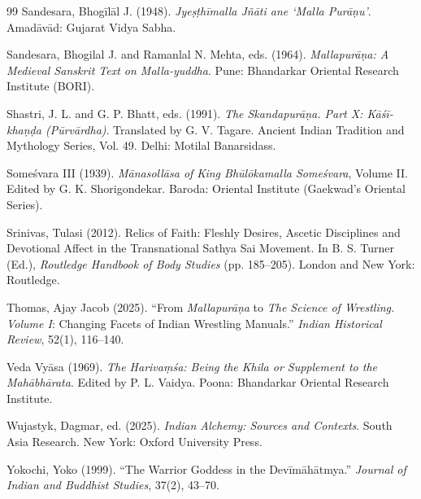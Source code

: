 \documentclass[11pt,twoside,letterpaper]{article}
\begin{document}
\begin{thebibliography}{99}
Sandesara, Bhogīlāl J. (1948). \textit{Jyeṣṭhīmalla Jñāti ane `Malla Purāṇu'}. Amadāvād: Gujarat Vidya Sabha.

Sandesara, Bhogilal J. and Ramanlal N. Mehta, eds. (1964). \textit{Mallapurāṇa: A Medieval Sanskrit Text on Malla-yuddha}. Pune: Bhandarkar Oriental Research Institute (BORI).

Shastri, J. L. and G. P. Bhatt, eds. (1991). \textit{The Skandapurāṇa. Part X: Kāśī-khaṇḍa (Pūrvārdha)}. Translated by G. V. Tagare. Ancient Indian Tradition and Mythology Series, Vol. 49. Delhi: Motilal Banarsidass.

Someśvara III (1939). \textit{Mānasollāsa of King Bhūlōkamalla Someśvara}, Volume II. Edited by G. K. Shorigondekar. Baroda: Oriental Institute (Gaekwad's Oriental Series).

Srinivas, Tulasi (2012). Relics of Faith: Fleshly Desires, Ascetic Disciplines and Devotional Affect in the Transnational Sathya Sai Movement. In B. S. Turner (Ed.), \textit{Routledge Handbook of Body Studies} (pp. 185--205). London and New York: Routledge.

Thomas, Ajay Jacob (2025). ``From \textit{Mallapurāṇa} to \textit{The Science of Wrestling. Volume I}: Changing Facets of Indian Wrestling Manuals.'' \textit{Indian Historical Review}, 52(1), 116--140.

Veda Vyāsa (1969). \textit{The Harivaṃśa: Being the Khila or Supplement to the Mahābhārata}. Edited by P. L. Vaidya. Poona: Bhandarkar Oriental Research Institute.

Wujastyk, Dagmar, ed. (2025). \textit{Indian Alchemy: Sources and Contexts}. South Asia Research. New York: Oxford University Press.

Yokochi, Yoko (1999). ``The Warrior Goddess in the Devīmāhātmya.'' \textit{Journal of Indian and Buddhist Studies}, 37(2), 43--70.

\end{thebibliography}
\end{document}
